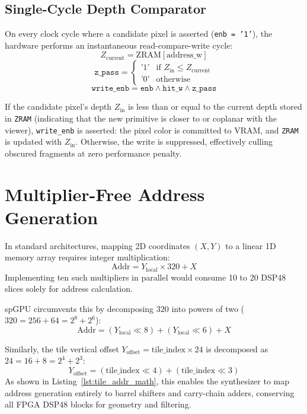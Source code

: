 \subsection{Single-Cycle Depth Comparator}
On every clock cycle where a candidate pixel is asserted (\texttt{enb = '1'}), the hardware performs an instantaneous read-compare-write cycle:
\begin{equation}
Z_{\text{current}} = \text{ZRAM}[\text{address\_w}]
\end{equation}
\begin{equation}
\texttt{z\_pass} = \begin{cases} 
\text{'1'} & \text{if } Z_{\text{in}} \le Z_{\text{current}} \\ 
\text{'0'} & \text{otherwise} 
\end{cases}
\end{equation}
\begin{equation}
\texttt{write\_enb} = \texttt{enb} \land \texttt{hit\_w} \land \texttt{z\_pass}
\end{equation}

If the candidate pixel's depth $Z_{\text{in}}$ is less than or equal to the current depth stored in \texttt{ZRAM} (indicating that the new primitive is closer to or coplanar with the viewer), \texttt{write\_enb} is asserted: the pixel color is committed to VRAM, and \texttt{ZRAM} is updated with $Z_{\text{in}}$. Otherwise, the write is suppressed, effectively culling obscured fragments at zero performance penalty.

\section{Multiplier-Free Address Generation}
In standard architectures, mapping 2D coordinates $(X, Y)$ to a linear 1D memory array requires integer multiplication:
\begin{equation}
\text{Addr} = Y_{\text{local}} \times 320 + X
\end{equation}
Implementing ten such multipliers in parallel would consume 10 to 20 DSP48 slices solely for address calculation. 

spGPU circumvents this by decomposing $320$ into powers of two ($320 = 256 + 64 = 2^8 + 2^6$):
\begin{equation}
\text{Addr} = (Y_{\text{local}} \ll 8) + (Y_{\text{local}} \ll 6) + X
\end{equation}

Similarly, the tile vertical offset $Y_{\text{offset}} = \text{tile\_index} \times 24$ is decomposed as $24 = 16 + 8 = 2^4 + 2^3$:
\begin{equation}
Y_{\text{offset}} = (\text{tile\_index} \ll 4) + (\text{tile\_index} \ll 3)
\end{equation}
As shown in Listing~\ref{lst:tile_addr_math}, this enables the synthesizer to map address generation entirely to barrel shifters and carry-chain adders, conserving all FPGA DSP48 blocks for geometry and filtering.

